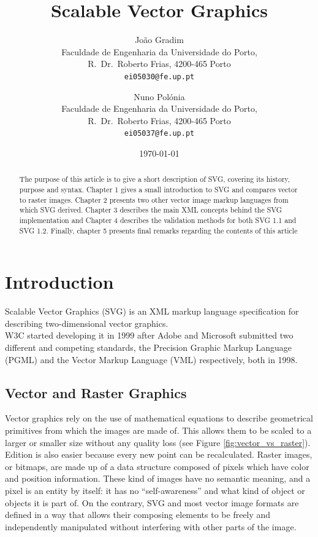 \documentclass[twocolumn,twoside,10pt,a4paper]{article}
\title{Scalable Vector Graphics}
\author{João Gradim\\
\small Faculdade de Engenharia da Universidade do Porto,\\[-0.8ex]
\small R.\ Dr.\ Roberto Frias, 4200-465 Porto\\[-0.8ex]
\small \texttt{ei05030@fe.up.pt}\\
\and
Nuno Polónia\\
\small Faculdade de Engenharia da Universidade do Porto,\\[-0.8ex]
\small R.\ Dr.\ Roberto Frias, 4200-465 Porto\\[-0.8ex]
\small \texttt{ei05037@fe.up.pt}
}
\date{\today}
\begin{document}
\maketitle
\thispagestyle{plain}

\begin{abstract}
The purpose of this article is to give a short description of SVG, covering its history, purpose and syntax. Chapter 1 gives a small introduction to SVG and compares vector to raster images. Chapter 2 presents two other vector image markup languages from which SVG derived. Chapter 3 describes the main XML concepts behind the SVG implementation and Chapter 4 describes the validation methods for both SVG 1.1 and SVG 1.2. Finally, chapter 5 presents final remarks regarding the contents of this article\\
\end{abstract}

\section{Introduction}\label{sec:intro}
Scalable Vector Graphics (SVG) is an XML markup language specification for describing two-dimensional vector graphics.\\
W3C started developing it in 1999 after Adobe and Microsoft submitted two different and competing standards, the Precision Graphic Markup Language (PGML) and the Vector Markup Language (VML) respectively, both in 1998.\\

\subsection{Vector and Raster Graphics}
Vector graphics rely on the use of mathematical equations to describe geometrical primitives from which the images are made of. This allows them to be scaled to a larger or smaller size without any quality loss (see Figure \ref{fig:vector_vs_raster}). Edition is also easier because every new point can be recalculated. Raster images, or bitmaps, are made up of a data structure composed of pixels which have color and position information. These kind of images have no semantic meaning, and a pixel is an entity by itself: it has no ``self-awareness''  and what kind of object or objects it is part of. On the contrary, SVG and most vector image formats are defined in a way that allows their composing elements to be freely and independently manipulated without interfering with other parts of the image.
\end{document}
